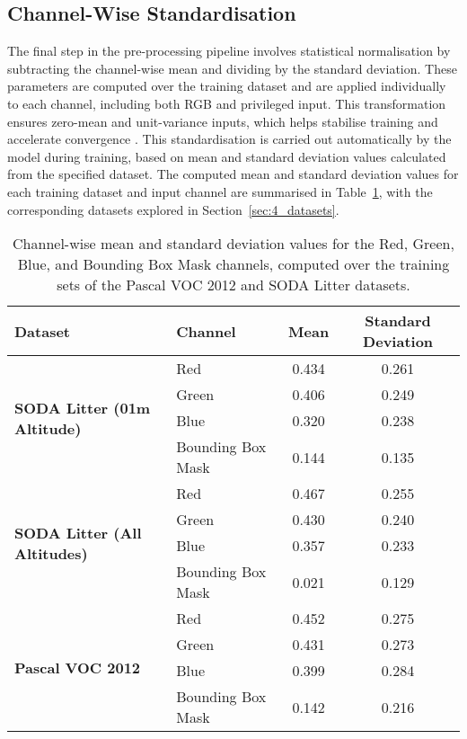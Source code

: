\subsection{Channel-Wise Standardisation}
\label{subsec:4_standardisation}

The final step in the pre-processing pipeline involves statistical normalisation by subtracting the channel-wise mean and dividing by the standard deviation. These parameters are computed over the training dataset and are applied individually to each channel, including both RGB and privileged input. This transformation ensures zero-mean and unit-variance inputs, which helps stabilise training and accelerate convergence \cite{min_max_normalisation}. This standardisation is carried out automatically by the model during training, based on mean and standard deviation values calculated from the specified dataset. The computed mean and standard deviation values for each training dataset and input channel are summarised in Table~\ref{tab:channel_stats}, with the corresponding datasets explored in Section~\ref{sec:4_datasets}.

\begin{table}[ht]
    \centering
    \begin{tabular}{llcc}
        \toprule
        \textbf{Dataset} & \textbf{Channel} & \textbf{Mean} & \textbf{Standard Deviation} \\
        \midrule
        \multirow{4}{*}{\textbf{SODA Litter (01m Altitude)}} 
            & Red               & 0.434 & 0.261 \\
            & Green             & 0.406 & 0.249 \\
            & Blue              & 0.320 & 0.238 \\
            & Bounding Box Mask & 0.144 & 0.135 \\
        \midrule
        \multirow{4}{*}{\textbf{SODA Litter (All Altitudes)}} 
            & Red               & 0.467 & 0.255 \\
            & Green             & 0.430 & 0.240 \\
            & Blue              & 0.357 & 0.233 \\
            & Bounding Box Mask & 0.021 & 0.129 \\
        \midrule
        \multirow{4}{*}{\textbf{Pascal VOC 2012}} 
            & Red               & 0.452 & 0.275 \\
            & Green             & 0.431 & 0.273 \\
            & Blue              & 0.399 & 0.284 \\
            & Bounding Box Mask & 0.142 & 0.216 \\
        \bottomrule
    \end{tabular}
    \caption{Channel-wise mean and standard deviation values for the Red, Green, Blue, and Bounding Box Mask channels, computed over the training sets of the Pascal VOC 2012 and SODA Litter datasets.}
    \label{tab:channel_stats}
\end{table}

